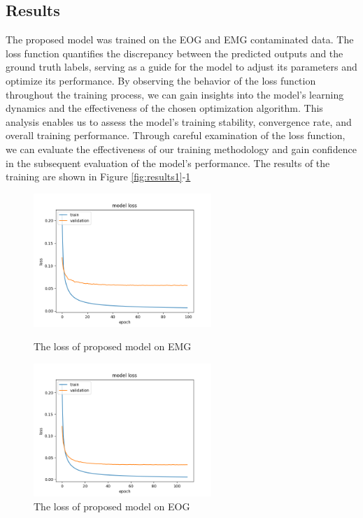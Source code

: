 \documentclass[a4paper, noexaminfo]{sapthesis}
\begin{document}
\subsection{Results}
The proposed model was trained on the EOG and EMG contaminated
data. The loss function quantifies the discrepancy between the 
predicted outputs and the ground truth labels, serving as a 
guide for the model to adjust its parameters and optimize its 
performance. By observing the behavior of the loss function 
throughout the training process, we can gain insights into the 
model's learning dynamics and the effectiveness of the chosen 
optimization algorithm. This analysis enables us to assess the 
model's training stability, convergence rate, and overall training 
performance. Through careful examination of the loss function, 
we can evaluate the effectiveness of our training methodology 
and gain confidence in the subsequent evaluation of the model's 
performance. The results of the training are shown in 
Figure \ref{fig:results1}-\ref{fig:results2}
\begin{figure}[h!]
\centering
\includegraphics[width=0.6\textwidth]{./results/res_bigru_light_LReLU/EMG/loss.png}
\caption{The loss of proposed model on EMG}
\label{fig:results1}
\includegraphics[width=0.6\textwidth]{./results/res_bigru_light_LReLU/EOG/loss.png}
\caption{The loss of proposed model on EOG}
\label{fig:results2}
\end{figure}
\end{document}
